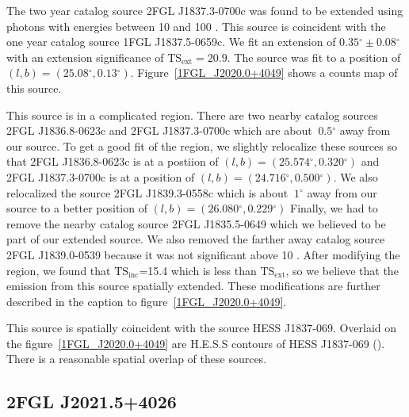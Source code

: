 \documentclass[12pt,preprint]{aastex}
\newcommand{\gev}{\text{GeV}\xspace}
\newcommand{\tev}{\text{TeV}\xspace}
\newcommand{\tsext}{{\ensuremath{\text{TS}_\text{ext}}}\xspace}
\newcommand{\tsinc}{\ensuremath{\text{TS}_\text{inc}}\xspace}
\renewcommand{\deg}{\ensuremath{^\circ}\xspace}
\begin{document}

The two year catalog source 2FGL J1837.3-0700c was found to be extended
using photons with energies between 10 \gev and 100 \gev. This source
is coincident with the one year catalog source 1FGL J1837.5-0659c. We
fit an extension of $0.35\deg\pm0.08\deg$ with an extension
significance of $\tsext=20.9$.  The source was fit to a position of
$(l,b)=(25.08\deg,0.13\deg)$.  Figure~\ref{1FGL_J2020.0+4049} shows a
counts map of this source.

This source is in a complicated region. There are two nearby
catalog sources 2FGL J1836.8-0623c and 2FGL J1837.3-0700c which are
about $~0.5\deg$ away from our source. To get a good fit of the region,
we slightly relocalize these sources so that 2FGL J1836.8-0623c is at
a postiion of $(l,b)=(25.574\deg,0.320\deg)$ and 2FGL J1837.3-0700c is
at a position of $(l,b)=(24.716\deg,0.500\deg)$.  We also relocalized
the source 2FGL J1839.3-0558c which is about $~1\deg$ away from our
source to a better position of $(l,b)=(26.080\deg,0.229\deg)$ Finally,
we had to remove the nearby catalog source 2FGL J1835.5-0649 which we
believed to be part of our extended source. We also removed the farther
away catalog source 2FGL J1839.0-0539 because it was not significant
above 10 \gev.  After modifying the region, we found that \tsinc=15.4
which is less than \tsext, so we believe that the emission from this
source spatially extended.  These modifications are further described
in the caption to figure~\ref{1FGL_J2020.0+4049}.

This source is spatially coincident with the \tev source HESS J1837-069.
Overlaid on the figure~\ref{1FGL_J2020.0+4049} are H.E.S.S contours of
HESS J1837-069 (\cite{HESS_plane_survey}). There is a reasonable spatial
overlap of these sources.


\subsection{2FGL J2021.5+4026}
\label{section_2FGL J2021.5+4026}
\end{document}
